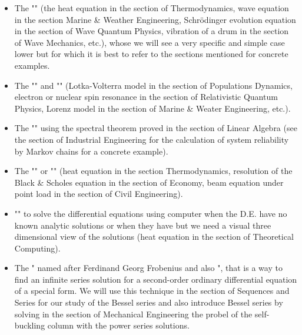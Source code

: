 	\begin{itemize}
		\item The "" (the heat equation in the section of Thermodynamics, wave equation in the section Marine \& Weather Engineering, Schrödinger evolution equation in the section of Wave Quantum Physics, vibration of a drum in the section of Wave Mechanics, etc.), whose we will see a very specific and simple case lower but for which it is best to refer to the sections mentioned for concrete examples.
		
		\item The "" and "" (Lotka-Volterra model in the section of Populations Dynamics, electron or nuclear spin resonance in the section of Relativistic Quantum Physics, Lorenz model in the section of Marine \& Weater Engineering, etc.).
		
		\item The "" using the spectral theorem proved in the section of Linear Algebra (see the section of Industrial Engineering for the calculation of system reliability by Markov chains for a concrete example).
		
		\item The "" or "" (heat equation in the section Thermodynamics, resolution of the Black \& Scholes equation in the section of Economy, beam equation  under point load in the section of Civil Engineering).
		
		\item "" to solve the differential equations using computer when the D.E. have no known analytic solutions or when they have but we need a visual three dimensional view of the solutions (heat equation in the section of Theoretical Computing).
		
		\item The " named after Ferdinand Georg Frobenius and  also ", that is a way to find an infinite series solution for a second-order ordinary differential equation of a special form. We will use this technique in the section of Sequences and Series for our study of the Bessel series and also introduce Bessel series by solving in the section of Mechanical Engineering the probel of the self-buckling column with the power series solutions.
	\end{itemize}
